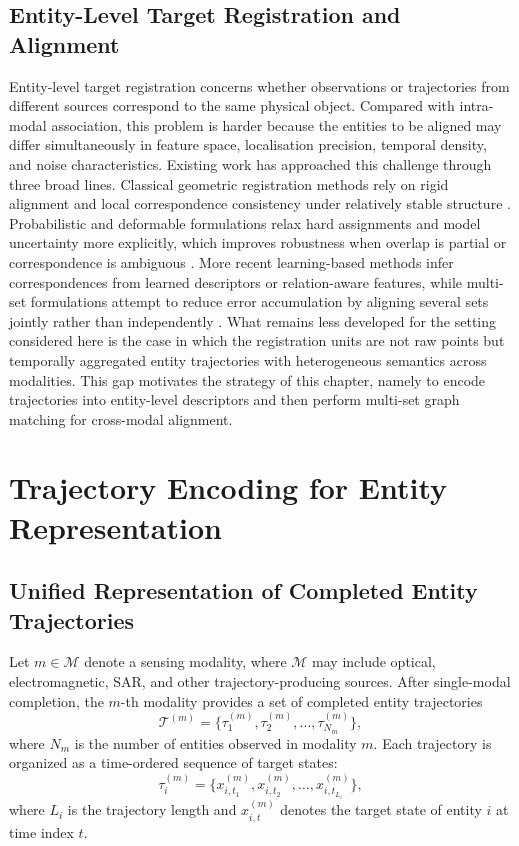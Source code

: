 \subsection{Entity-Level Target Registration and Alignment}
Entity-level target registration concerns whether observations or trajectories from different sources correspond to the same physical object. Compared with intra-modal association, this problem is harder because the entities to be aligned may differ simultaneously in feature space, localisation precision, temporal density, and noise characteristics. Existing work has approached this challenge through three broad lines. Classical geometric registration methods rely on rigid alignment and local correspondence consistency under relatively stable structure \cite{besl1992icp,rusinkiewicz2001icpvariants,chen1991rangeimages,segal2009gicp,tam2013registration}. Probabilistic and deformable formulations relax hard assignments and model uncertainty more explicitly, which improves robustness when overlap is partial or correspondence is ambiguous \cite{myronenko2010cpd,chui2003nonrigid}. More recent learning-based methods infer correspondences from learned descriptors or relation-aware features, while multi-set formulations attempt to reduce error accumulation by aligning several sets jointly rather than independently \cite{yew2020rpmnet,wang2019dcp,aoki2019pointnetlk,yanagi2025singleoptimization,maset2017multiview,torsello2011multiview,evangelidis2018joint,zhu2020multiviewem}. What remains less developed for the setting considered here is the case in which the registration units are not raw points but temporally aggregated entity trajectories with heterogeneous semantics across modalities. This gap motivates the strategy of this chapter, namely to encode trajectories into entity-level descriptors and then perform multi-set graph matching for cross-modal alignment.

\section{Trajectory Encoding for Entity Representation}

\subsection{Unified Representation of Completed Entity Trajectories}
Let \(m \in \mathcal{M}\) denote a sensing modality, where \(\mathcal{M}\) may include optical, electromagnetic, SAR, and other trajectory-producing sources. After single-modal completion, the \(m\)-th modality provides a set of completed entity trajectories
\begin{equation}
  \mathcal{T}^{(m)} = \{\tau_1^{(m)},\tau_2^{(m)},\ldots,\tau_{N_m}^{(m)}\},
\end{equation}
where \(N_m\) is the number of entities observed in modality \(m\). Each trajectory is organized as a time-ordered sequence of target states:
\begin{equation}
  \tau_i^{(m)} = \{x_{i,t_1}^{(m)},x_{i,t_2}^{(m)},\ldots,x_{i,t_{L_i}}^{(m)}\},
\end{equation}
where \(L_i\) is the trajectory length and \(x_{i,t}^{(m)}\) denotes the target state of entity \(i\) at time index \(t\).

